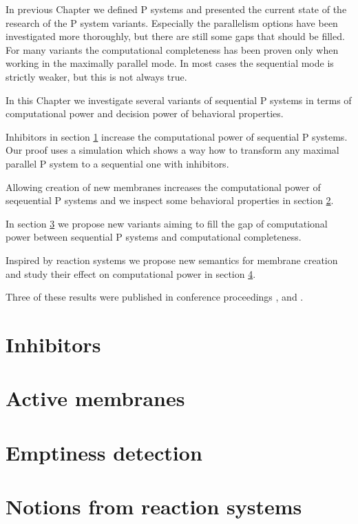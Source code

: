 In previous Chapter we defined P systems and presented the current state of the research of the P system variants. Especially the parallelism options have been investigated more thoroughly, but there are still some gaps that should be filled. For many variants the computational completeness has been proven only when working in the maximally parallel mode. In most cases the sequential mode is strictly weaker, but this is not always true.

In this Chapter we investigate several variants of sequential P systems in terms of computational power and decision power of behavioral properties.

Inhibitors in section \ref{sec:inhibitors} increase the computational power of sequential P systems. Our proof uses a simulation which shows a way how to transform any maximal parallel P system to a sequential one with inhibitors.

Allowing creation of new membranes increases the computational power of seqeuential P systems \cite{Ibarra05Active} and we inspect some behavioral properties in section \ref{sec:active_membranes}.

In section \ref{sec:emptiness_detection} we propose new variants aiming to fill the gap of computational power between sequential P systems and computational completeness.

Inspired by reaction systems we propose new semantics for membrane creation and study their effect on computational power in section \ref{sec:notions_from_reaction_systems}. 

Three of these results were published in conference proceedings \cite{Kovac14Inhibitors}, \cite{Kovac15TerminationProblems} and \cite{Kovac15SequentialActiveSet}. 

\section{Inhibitors} %
\label{sec:inhibitors}


\section{Active membranes} %
\label{sec:active_membranes}


\section{Emptiness detection} %
\label{sec:emptiness_detection}


\section{Notions from reaction systems} %
\label{sec:notions_from_reaction_systems}

